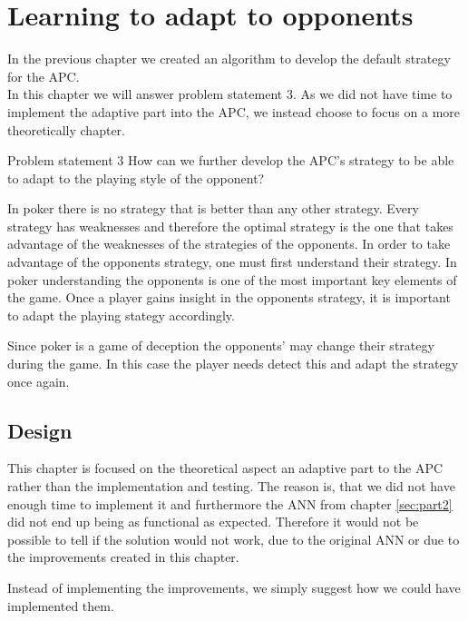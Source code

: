 	\section{Learning to adapt to opponents}
\label{sec:part3}

In the previous chapter we created an algorithm to develop the default strategy for the APC. \\

In this chapter we will answer problem statement 3.
As we did not have time to implement the adaptive part into the APC, we instead choose to focus on a more theoretically chapter.


\vspace{4mm}
\begin{statementBox2}{Problem statement 3}
How can we further develop the APC's strategy to be able to adapt to the playing style of the opponent?
\end{statementBox2}
\vspace{4mm} 


In poker there is no strategy that is better than any other strategy. Every strategy has weaknesses and therefore the optimal strategy is the one that takes advantage of the weaknesses of the strategies of the opponents. In order to take advantage of the opponents strategy, one must first understand their strategy. In poker understanding the opponents is one of the most important key elements of the game. Once a player gains insight in the opponents strategy, it is important to adapt the playing stategy accordingly.


Since poker is a game of deception the opponents' may change their strategy during the game. In this case the player needs detect this and adapt the strategy once again. 

\subsection{Design}
This chapter is focused on the theoretical aspect an adaptive part to the APC rather than the implementation and testing. The reason is, that we did not have enough time to implement it and furthermore the ANN from chapter \ref{sec:part2} did not end up being as functional as expected. Therefore it would not be possible to tell if the solution would not work, due to the original ANN or due to the improvements created in this chapter. 

Instead of implementing the improvements, we simply suggest how we could have implemented them.\\

